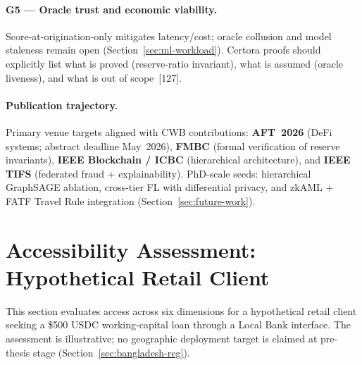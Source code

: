 \documentclass[12pt,a4paper]{report}
\begin{document}
\paragraph{G5 --- Oracle trust and economic viability.}
Score-at-origination-only mitigates latency/cost; oracle collusion and model staleness remain open (Section~\ref{sec:ml-workload}). Certora proofs should explicitly list what is proved (reserve-ratio invariant), what is assumed (oracle liveness), and what is out of scope~[127].

\paragraph{Publication trajectory.}
Primary venue targets aligned with CWB contributions: \textbf{AFT~2026} (DeFi systems; abstract deadline May~2026), \textbf{FMBC} (formal verification of reserve invariants), \textbf{IEEE Blockchain / ICBC} (hierarchical architecture), and \textbf{IEEE TIFS} (federated fraud + explainability). PhD-scale seeds: hierarchical GraphSAGE ablation, cross-tier FL with differential privacy, and zkAML + FATF Travel Rule integration (Section~\ref{sec:future-work}).

\section{Accessibility Assessment: Hypothetical Retail Client}

This section evaluates access across six dimensions for a hypothetical retail client seeking a \$500 USDC working-capital loan through a Local Bank interface. The assessment is illustrative; no geographic deployment target is claimed at pre-thesis stage (Section~\ref{sec:bangladesh-reg}).
\end{document}
